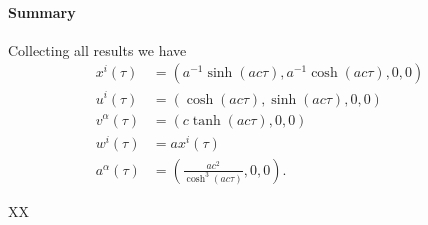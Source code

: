 {\paragraph{Summary}
%
Collecting all results we have
%
\begin{equation}\label{eqn:relativisticElectrodynamicsT2:150}
\begin{aligned}
x^i(\tau) &= \left( a^{-1} \sinh( a c \tau), a^{-1} \cosh( a c \tau ), 0, 0 \right) \\
u^i(\tau) &= \left( \cosh( a c \tau ), \sinh( a c \tau ), 0, 0\right) \\
v^\alpha(\tau) &= \left( c \tanh(a c \tau), 0, 0 \right) \\
w^i(\tau) &= a x^i(\tau) \\
a^\alpha(\tau) &= \left( \frac{a c^2}{\cosh^3 (a c \tau)}, 0, 0 \right).
\end{aligned}
\end{equation}
%
} %

XX

